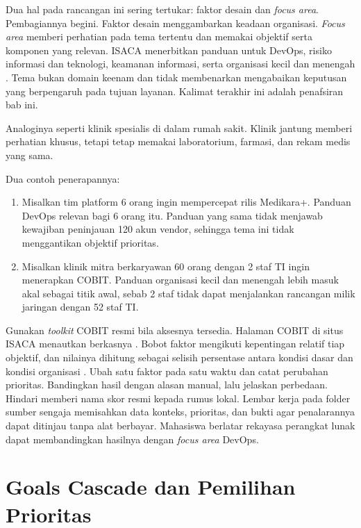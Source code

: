 Dua hal pada rancangan ini sering tertukar: faktor desain dan \textit{focus area}. Pembagiannya begini. Faktor desain
menggambarkan keadaan organisasi. \textit{Focus area} memberi perhatian pada tema tertentu dan memakai objektif serta
komponen yang relevan. ISACA menerbitkan panduan untuk DevOps, risiko informasi dan teknologi, keamanan informasi,
serta organisasi kecil dan menengah \cite{c04-halaman}. Tema bukan domain keenam dan tidak membenarkan mengabaikan
keputusan yang berpengaruh pada tujuan layanan. Kalimat terakhir ini adalah penafsiran bab ini.

Analoginya seperti klinik spesialis di dalam rumah sakit. Klinik jantung memberi perhatian khusus, tetapi tetap memakai
laboratorium, farmasi, dan rekam medis yang sama.

Dua contoh penerapannya:
\begin{enumerate}
  \item Misalkan tim platform 6 orang ingin mempercepat rilis Medikara+. Panduan DevOps relevan bagi 6 orang itu.
  Panduan yang sama tidak menjawab kewajiban peninjauan 120 akun vendor, sehingga tema ini tidak menggantikan
  objektif prioritas.
  \item Misalkan klinik mitra berkaryawan 60 orang dengan 2 staf TI ingin menerapkan COBIT. Panduan organisasi kecil
  dan menengah lebih masuk akal sebagai titik awal, sebab 2 staf tidak dapat menjalankan rancangan milik jaringan
  dengan 52 staf TI.
\end{enumerate}

\begin{pendalaman}
Gunakan \textit{toolkit} COBIT resmi bila aksesnya tersedia. Halaman COBIT di situs ISACA menautkan berkasnya
\cite{c04-halaman}. Bobot faktor mengikuti kepentingan relatif tiap objektif, dan nilainya dihitung sebagai selisih
persentase antara kondisi dasar dan kondisi organisasi \cite{c04-perbandingan}. Ubah satu faktor pada satu waktu dan
catat perubahan prioritas. Bandingkan hasil dengan alasan manual, lalu jelaskan perbedaan. Hindari memberi nama skor resmi
kepada rumus lokal. Lembar kerja pada folder sumber sengaja memisahkan data konteks, prioritas, dan bukti agar penalarannya
dapat ditinjau tanpa alat berbayar. Mahasiswa berlatar rekayasa perangkat lunak dapat membandingkan hasilnya dengan
\textit{focus area} DevOps.
\end{pendalaman}

\section{Goals Cascade dan Pemilihan Prioritas}

